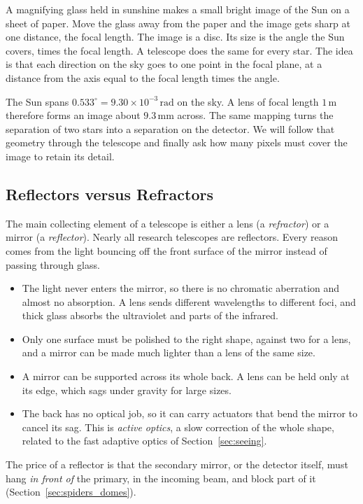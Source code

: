A magnifying glass held in sunshine makes a small bright image of the Sun on a sheet of paper. Move the glass away from the paper and the image gets sharp at one distance, the focal length. The image is a disc. Its size is the angle the Sun covers, times the focal length. A telescope does the same for every star. The idea is that each direction on the sky goes to one point in the focal plane, at a distance from the axis equal to the focal length times the angle.

The Sun spans $0.533^\circ=9.30\times10^{-3}\,\mathrm{rad}$ on the sky. A lens of focal length $1\,\mathrm m$ therefore forms an image about $9.3\,\mathrm{mm}$ across. The same mapping turns the separation of two stars into a separation on the detector. We will follow that geometry through the telescope and finally ask how many pixels must cover the image to retain its detail.

\subsection{Reflectors versus Refractors}

The main collecting element of a telescope is either a lens (a \emph{refractor}) or a mirror (a \emph{reflector}). Nearly all research telescopes are reflectors. Every reason comes from the light bouncing off the front surface of the mirror instead of passing through glass.
\begin{itemize}
	\item The light never enters the mirror, so there is no chromatic aberration and almost no absorption. A lens sends different wavelengths to different foci, and thick glass absorbs the ultraviolet and parts of the infrared.
	\item Only one surface must be polished to the right shape, against two for a lens, and a mirror can be made much lighter than a lens of the same size.
	\item A mirror can be supported across its whole back. A lens can be held only at its edge, which sags under gravity for large sizes.
	\item The back has no optical job, so it can carry actuators that bend the mirror to cancel its sag. This is \emph{active optics}, a slow correction of the whole shape, related to the fast adaptive optics of Section~\ref{sec:seeing}.
\end{itemize}
The price of a reflector is that the secondary mirror, or the detector itself, must hang \emph{in front of} the primary, in the incoming beam, and block part of it (Section~\ref{sec:spiders_domes}).

